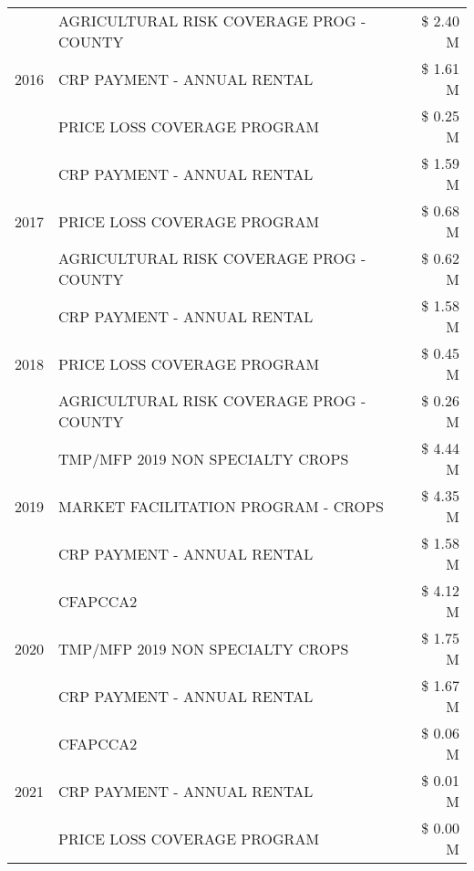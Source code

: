 \begin{tabular}{llr}
\cline{1-3}
\multirow[t]{3}{*}{2016} & AGRICULTURAL RISK COVERAGE PROG - COUNTY & \$ 2.40 M \\
 & CRP PAYMENT - ANNUAL RENTAL & \$ 1.61 M \\
 & PRICE LOSS COVERAGE PROGRAM & \$ 0.25 M \\
\cline{1-3}
\multirow[t]{3}{*}{2017} & CRP PAYMENT - ANNUAL RENTAL & \$ 1.59 M \\
 & PRICE LOSS COVERAGE PROGRAM & \$ 0.68 M \\
 & AGRICULTURAL RISK COVERAGE PROG - COUNTY & \$ 0.62 M \\
\cline{1-3}
\multirow[t]{3}{*}{2018} & CRP PAYMENT - ANNUAL RENTAL & \$ 1.58 M \\
 & PRICE LOSS COVERAGE PROGRAM & \$ 0.45 M \\
 & AGRICULTURAL RISK COVERAGE PROG - COUNTY & \$ 0.26 M \\
\cline{1-3}
\multirow[t]{3}{*}{2019} & TMP/MFP 2019 NON SPECIALTY CROPS & \$ 4.44 M \\
 & MARKET FACILITATION PROGRAM - CROPS & \$ 4.35 M \\
 & CRP PAYMENT - ANNUAL RENTAL & \$ 1.58 M \\
\cline{1-3}
\multirow[t]{3}{*}{2020} & CFAPCCA2 & \$ 4.12 M \\
 & TMP/MFP 2019 NON SPECIALTY CROPS & \$ 1.75 M \\
 & CRP PAYMENT - ANNUAL RENTAL & \$ 1.67 M \\
\cline{1-3}
\multirow[t]{3}{*}{2021} & CFAPCCA2 & \$ 0.06 M \\
 & CRP PAYMENT - ANNUAL RENTAL & \$ 0.01 M \\
 & PRICE LOSS COVERAGE PROGRAM & \$ 0.00 M \\
\cline{1-3}
\bottomrule
\end{tabular}
